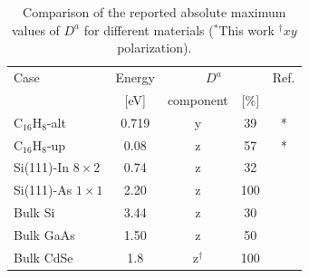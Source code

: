 \documentclass[pss]{wiley2sp} %
\begin{document}
\begin{table}[b]
  \sidecaption
  \begin{tabular}{lcccc}
  \hline
  Case & Energy &  \multicolumn{2}{c}{$D^{a}$} &  Ref.\\
  \cline{3-4}
  & [eV]   & component & [\%] \\
  \hline
  C$_{16}$H$_{8}$-alt  & 0.719& y & 39     & * \\
  C$_{16}$H$_{8}$-up   & 0.08 & z & 57     & * \\
  Si(111)-In $8\times2$& 0.74 & z & 32     & \cite{arzate2014optical}  \\
  Si(111)-As $1\times1$& 2.20 & z & 100    & \cite{mendoza2012optical} \\
  Bulk Si              & 3.44 & z & 30     & \cite{nastos2007full}     \\
  Bulk GaAs            & 1.50 & z & 50     & \cite{nastos2007full,bhat2005excitonic} \\
  Bulk CdSe            & 1.8  & z$^{\dag}$ & 100& \cite{nastos2007full}\\
  \hline
  \end{tabular}
  \caption[]{%
  Comparison of the reported absolute maximum values of {$D^{a}$} for different materials ($^{*}$This work $^{\dag}xy$ polarization).}
  \label{tab:dacomp}
\end{table}
\end{document}
